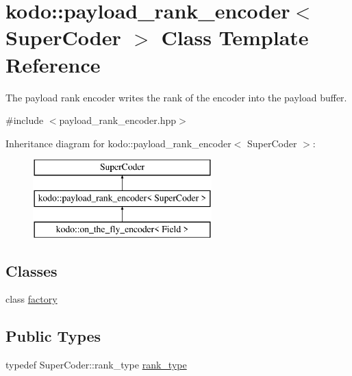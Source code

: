 \hypertarget{classkodo_1_1payload__rank__encoder}{\section{kodo\-:\-:payload\-\_\-rank\-\_\-encoder$<$ Super\-Coder $>$ Class Template Reference}
\label{classkodo_1_1payload__rank__encoder}
}


The payload rank encoder writes the rank of the encoder into the payload buffer.  




{\ttfamily \#include $<$payload\-\_\-rank\-\_\-encoder.\-hpp$>$}

Inheritance diagram for kodo\-:\-:payload\-\_\-rank\-\_\-encoder$<$ Super\-Coder $>$\-:\begin{figure}[H]
\begin{center}
\leavevmode
\includegraphics[height=3.000000cm]{classkodo_1_1payload__rank__encoder}
\end{center}
\end{figure}
\subsection*{Classes}
\begin{DoxyCompactItemize}
\item 
class \hyperlink{classkodo_1_1payload__rank__encoder_1_1factory}{factory}
\end{DoxyCompactItemize}
\subsection*{Public Types}
\begin{DoxyCompactItemize}
\item 
typedef Super\-Coder\-::rank\-\_\-type \hyperlink{classkodo_1_1payload__rank__encoder_ad11d3760c19a3c5493f97b9a561f90aa}{rank\-\_\-type}
\begin{DoxyCompactList}\small\item\em \end{DoxyCompactList}\end{DoxyCompactItemize}
